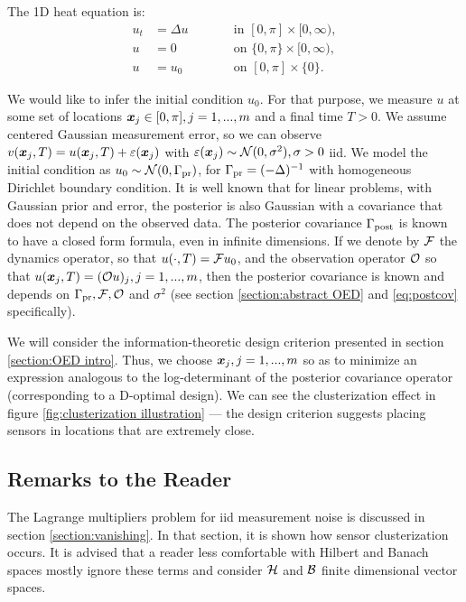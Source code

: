 \documentclass{amsart}
\numberwithin{equation}{section}
\begin{document}
The 1D heat equation is:
\begin{subequations}\label{eq:heat equation}
  \begin{alignat}{2}
    u_t &= \Delta u &&\qquad \text{in } [0,\pi] \times [0,\infty),\\
      u &= 0 &&\qquad \text{on } \{0, \pi\} \times [0,\infty),\\
        u &= u_0 &&\qquad \text{on }[0,\pi] \times \{0\}.
  \end{alignat}
\end{subequations}

We would like to infer the initial condition $u_0$. For that purpose,
we measure $u$ at some set of locations ${\boldsymbol{x}}_j \in [0,\pi], j=1,...,m$
and a final time $T > 0$. We assume centered Gaussian measurement
error, so we can observe $v({\boldsymbol{x}}_j,T) = u({\boldsymbol{x}}_j,T) + \varepsilon({\boldsymbol{x}}_j)$ with
$\varepsilon({\boldsymbol{x}}_j) \sim \mathcal{N}(0, \sigma^2), \sigma > 0$ iid.  We model the
initial condition as $u_0 \sim \mathcal{N}(0,\Gamma_{\textup{pr}})$, for $\Gamma_{\textup{pr}} =
(-\Delta)^{-1}$ with homogeneous Dirichlet boundary condition. It is
well known \cite{Tarantola05} that for linear problems, with Gaussian
prior and error, the posterior is also Gaussian with a covariance that
does not depend on the observed data. The posterior covariance
$\Gamma_{\textup{post}}$ is known to have a closed form formula, even in infinite
dimensions\cite{Stuart10}. If we denote by $\mathcal{F}$ the dynamics
operator, so that $u( \cdot,T) = \mathcal{F} u_0$, and the observation
operator $\mathcal{O}$ so that $u({\boldsymbol{x}}_j,T) = (\mathcal{O} u)_j, j=1,...,m$, then the
posterior covariance is known and depends on $\Gamma_{\textup{pr}}, \mathcal{F}, \mathcal{O}$ and
$\sigma^2$ (see section \ref{section:abstract OED} and
\eqref{eq:postcov} specifically).

We will consider the information-theoretic design criterion presented
in section \ref{section:OED intro}. Thus, we choose ${\boldsymbol{x}}_j,j=1,...,m$
so as to minimize an expression analogous to the log-determinant of
the posterior covariance operator (corresponding to a D-optimal
design). We can see the clusterization effect in figure
\ref{fig:clusterization illustration} --- the design criterion
suggests placing sensors in locations that are extremely close.


\subsection{Remarks to the Reader}\label{subsec:plan}
The Lagrange multipliers problem for iid measurement noise is
discussed in section \ref{section:vanishing}. In that section, it is
shown how sensor clusterization occurs. It is advised that a reader
less comfortable with Hilbert and Banach spaces mostly ignore these
terms and consider $\mathcal{H}$ and $\mathcal{B}$ finite dimensional vector spaces.
\end{document}
